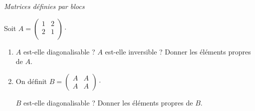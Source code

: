 \documentclass[a4paper,10pt]{report}
\begin{document}
\begin{center}
\textit{{ {\large Matrices définies par blocs}}}
\end{center}

\medskip

\begin{Exa} Soit $A= \begin{pmatrix}
1& 2 \\
2 & 1 \\
\end{pmatrix}\cdot$
\begin{enumerate}
\item $A$ est-elle diagonalisable ? $A$ est-elle inversible ? Donner les éléments propres de $A$.
\item  On définit $B = \begin{pmatrix}
A & A \\
A & A 
\end{pmatrix}\cdot$

$B$ est-elle diagonalisable ? Donner les éléments propres de $B$.
\end{enumerate}
\end{Exa}
\end{document}
